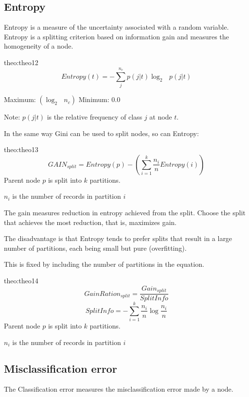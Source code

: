 \subsection{Entropy}
Entropy is a measure of the uncertainty associated with a random variable. Entropy is a splitting criterion based on information gain and measures the homogeneity of a node.


\bigskip
\begin{theo}[Entropy]{theo:theo12}
    \label{eq:entropy}
        \[
           Entropy(t) = -\sum_j^{n_c} p(j|t)\log_2 \text{ } p(j|t)
        \]
        \begin{center}
            Maximum: $(\log_2 \text{ } n_c)$ \qquad\qquad Minimum: $0.0$
        \end{center}
        Note: $p(j|t)$ is the relative frequency of class $j$ at node $t$.
\end{theo}

In the same way Gini can be used to split nodes, so can Entropy:

\bigskip
\begin{theo}{theo:theo13}
    \label{eq:entropysplit}
        \[
            GAIN_{split} = Entropy(p) - \left(\sum_{i=1}^k \frac{n_i}{n} Entropy(i)\right)
        \]
        Parent node $p$ is split into $k$ partitions.

        $n_i$ is the number of records in partition $i$
\end{theo}

The gain measures reduction in entropy achieved from the split. Choose the split that achieves the most reduction, that is, maximizes gain.

The disadvantage is that Entropy tends to prefer splits that result in a large number of partitions, each being small but pure (overfitting).

This is fixed by including the number of partitions in the equation.

\bigskip
\begin{theo}{theo:theo14}
    \label{eq:entropysplitratio}
        \[
            GainRation_{split} = \frac{Gain_{split}}{SplitInfo}
        \]
        \[
            SplitInfo = -\sum_{i=1}^k \frac{n_i}{n} \log\frac{n_i}{n}
        \]
        Parent node $p$ is split into $k$ partitions.

        $n_i$ is the number of records in partition $i$
\end{theo}

\subsection{Misclassification error}
The Classification error measures the misclassification error made by a node.

